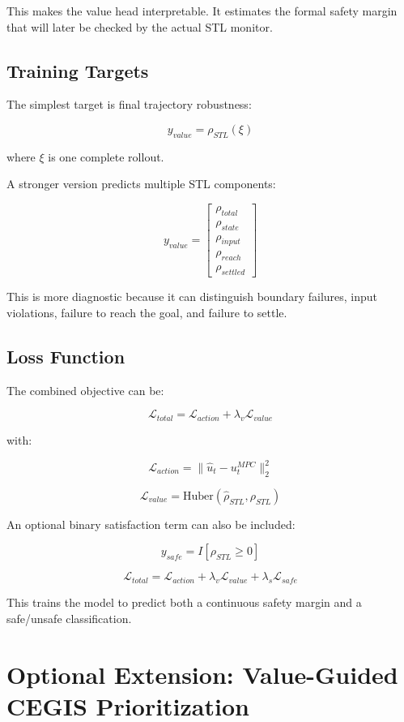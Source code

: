 \documentclass[11pt]{article}
\begin{document}
This makes the value head interpretable. It estimates the formal safety margin that will later be checked by the actual STL monitor.

\subsection{Training Targets}

The simplest target is final trajectory robustness:

\[
y_{value} = \rho_{STL}(\xi)
\]

where \(\xi\) is one complete rollout.

A stronger version predicts multiple STL components:

\[
y_{value} =
\begin{bmatrix}
\rho_{total} \\
\rho_{state} \\
\rho_{input} \\
\rho_{reach} \\
\rho_{settled}
\end{bmatrix}
\]

This is more diagnostic because it can distinguish boundary failures, input violations, failure to reach the goal, and failure to settle.

\subsection{Loss Function}

The combined objective can be:

\[
\mathcal{L}_{total}
=
\mathcal{L}_{action}
+
\lambda_v \mathcal{L}_{value}
\]

with:

\[
\mathcal{L}_{action}
=
\| \hat{u}_t - u^{MPC}_t \|_2^2
\]

\[
\mathcal{L}_{value}
=
\mathrm{Huber}(\hat{\rho}_{STL}, \rho_{STL})
\]

An optional binary satisfaction term can also be included:

\[
y_{safe} = I[\rho_{STL} \geq 0]
\]

\[
\mathcal{L}_{total}
=
\mathcal{L}_{action}
+
\lambda_v \mathcal{L}_{value}
+
\lambda_s \mathcal{L}_{safe}
\]

This trains the model to predict both a continuous safety margin and a safe/unsafe classification.

\section{Optional Extension: Value-Guided CEGIS Prioritization}
\end{document}
